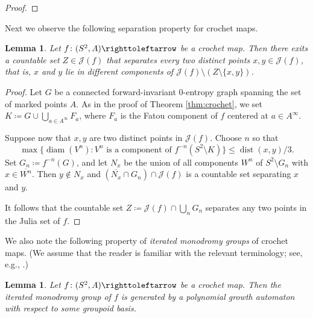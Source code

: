 \documentclass{amsart}
\theoremstyle{plain}
\newtheorem{lemma}[theorem]{Lemma}
\theoremstyle{definition}
\theoremstyle{remark}
\newcommand{\Jul}{{\mathcal J}}
\newcommand{\diam}{{\operatorname{diam}}}
\newcommand\selfmap{\righttoleftarrow}
\begin{document}
\begin{proof}
\end{proof}


Next we observe the following separation property for crochet maps.

\begin{lemma}
\label{lem:crochet-separating-set}
Let $f\colon(S^2,A)\selfmap$ be a crochet map. Then there exits a countable set $Z\in \Jul(f)$ that separates every two distinct points $x,y\in \Jul(f)$, that is, $x$ and $y$ lie in different components of $\Jul(f)\setminus (Z\setminus \{x,y\}) $.
\end{lemma}
\begin{proof}
 Let $G$ be a connected forward-invariant $0$-entropy graph spanning the set of marked points $A$.  As in the proof of Theorem \ref{thm:crochet}, we set $K\coloneq G\cup \bigcup_{a\in A^\infty} F_a$, where $F_a$ is the Fatou component of $f$ centered at $a\in A^\infty$.


Suppose now that $x,y$ are two distinct points in $\Jul(f)$.  Choose $n$ so that 
$$\max\{\diam(V^n):\text{$V^n$ is a component of $f^{-n}(S^2\setminus K)$}\}  \leq \operatorname{dist}(x,y)/3.$$
Set $G_n\coloneq f^{-n}(G)$, and let $N_x$ be the union of all components $W^n$ of $S^2\setminus G_n$ with $x\in \overline{W^n}$. Then $y\notin N_x$ and $(\overline{N_x}\cap G_n)\cap \Jul(f)$ is a countable set separating $x$ and $y$.

It follows that the countable set $Z\coloneq \Jul(f)\cap \bigcup_n G_n$ separates any two points in the Julia set of $f$.
\end{proof}

We also note the following property of \emph{iterated monodromy groups} of crochet maps. (We assume that the reader is familiar with the relevant terminology; see, e.g., \cite{Nekra}.)

\begin{lemma}
\label{lem:crochet-maps-imgs}
Let $f\colon(S^2,A)\selfmap$ be a crochet map. Then the iterated monodromy group of $f$ is generated by a polynomial growth automaton with respect to some groupoid basis.
\end{lemma}
\end{document}
